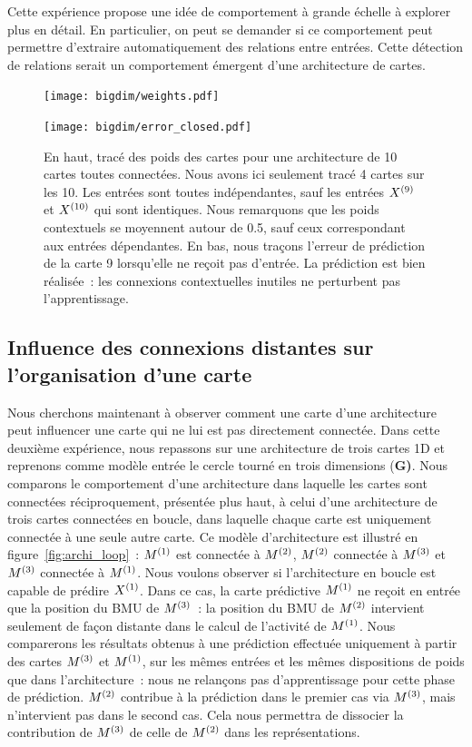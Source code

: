\documentclass[../main]{subfiles}
\begin{document}
Cette expérience propose une idée de comportement à grande échelle à explorer plus en détail.
En particulier, on peut se demander si ce comportement peut permettre d'extraire automatiquement des relations entre entrées. Cette détection de relations serait un comportement émergent d'une architecture de cartes.

\begin{figure}
	\begin{minipage}{\textwidth}
	\texttt{[image: bigdim/weights.pdf]}
	\end{minipage}
\begin{minipage}{\textwidth}
	\centering\texttt{[image: bigdim/error\_closed.pdf]}
	\caption{En haut, tracé des poids des cartes pour une architecture de 10 cartes toutes connectées. Nous avons ici seulement tracé 4 cartes sur les 10. Les entrées sont toutes indépendantes, sauf les entrées $X^{({9})}$ et $X^{({10})}$ qui sont identiques. Nous remarquons que les poids contextuels se moyennent autour de 0.5, sauf ceux correspondant aux entrées dépendantes. En bas, nous traçons l'erreur de prédiction de la carte 9 lorsqu'elle ne reçoit pas d'entrée. La prédiction est bien réalisée~: les connexions contextuelles inutiles ne perturbent pas l'apprentissage. \label{fig:bigdim}}
\end{minipage}
\end{figure}

\subsection{Influence des connexions distantes sur l'organisation d'une carte}

Nous cherchons maintenant à observer comment une carte d'une architecture peut influencer une carte qui ne lui est pas directement connectée.
Dans cette deuxième expérience, nous repassons sur une architecture de trois cartes 1D et reprenons comme modèle entrée le cercle tourné en trois dimensions (\textbf{G)}. 
Nous comparons le comportement d'une architecture dans laquelle les cartes sont connectées réciproquement, présentée plus haut, à celui d'une architecture de trois cartes connectées en boucle, dans laquelle chaque carte est uniquement connectée à une seule autre carte. 
Ce modèle d'architecture est illustré en figure~\ref{fig:archi_loop}~: $M^{({1})}$ est connectée à $M^{({2})}$, $M^{({2})}$ connectée à $M^{({3})}$ et $M^{({3})}$ connectée à $M^{({1})}$.
Nous voulons observer si l'architecture en boucle est capable de prédire $X^{({1})}$. 
Dans ce cas, la carte prédictive $M^{({1})}$ ne reçoit en entrée que la position du BMU de $M^{({3})}$~: la position du BMU de $M^{({2})}$ intervient seulement de façon distante dans le calcul de l'activité de $M^{({1})}$.
Nous comparerons les résultats obtenus à une prédiction effectuée uniquement à partir des cartes $M^{({3})}$ et $M^{({1})}$, sur les mêmes entrées et les mêmes dispositions de poids que dans l'architecture~: nous ne relançons pas d'apprentissage pour cette phase de prédiction.
$M^{({2})}$ contribue à la prédiction dans le premier cas via $M^{({3})}$, mais n'intervient pas dans le second cas.
Cela nous permettra de dissocier la contribution de $M^{({3})}$ de celle de $M^{({2})}$ dans les représentations.
\end{document}
